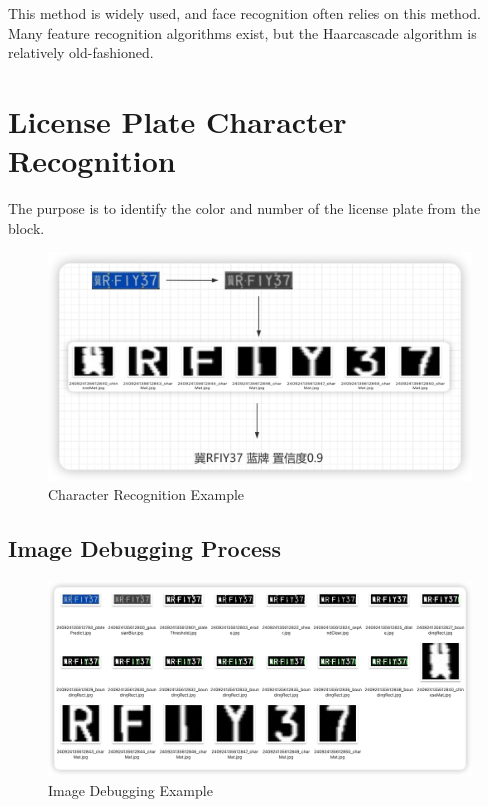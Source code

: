 \documentclass{article}
\begin{document}
	This method is widely used, and face recognition often relies on this method. Many feature recognition algorithms exist, but the Haarcascade algorithm is relatively old-fashioned.
	
	\section{License Plate Character Recognition}
	The purpose is to identify the color and number of the license plate from the block.
	
	\begin{figure}[H]
		\centering
		\includegraphics[width=\linewidth]{mdpic/image-20240924232836851.png}
		\caption{Character Recognition Example}
	\end{figure}
	
	\subsection{Image Debugging Process}
	\begin{figure}[H]
		\centering
		\includegraphics[width=\linewidth]{mdpic/image-20240924231544091.png}
		\caption{Image Debugging Example}
	\end{figure}
	
\end{document}
